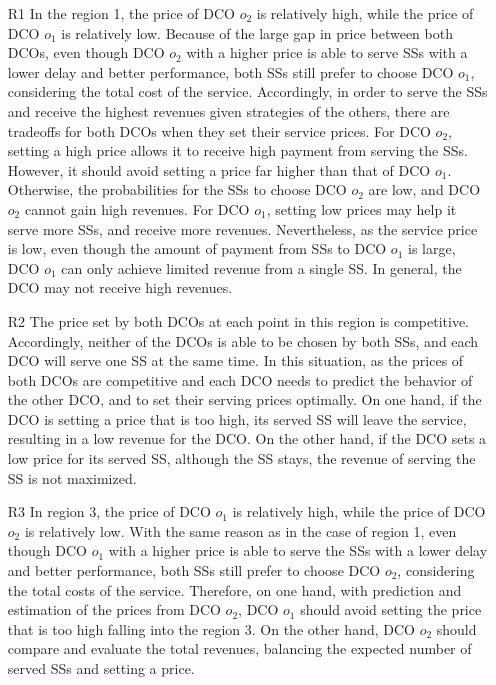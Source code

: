 \documentclass[twocolumn,10pt]{IEEEtran}
\begin{document}
\begin{enumerate}
  \item [R1] In the region 1, the price of DCO $o_2$ is relatively high, while the price of DCO $o_1$ is relatively low. Because of the large gap in price between both DCOs, even though DCO $o_2$ with a higher price is able to serve SSs with a lower delay and better performance, both SSs still prefer to choose DCO $o_1$, considering the total cost of the service. Accordingly, in order to serve the SSs and receive the highest revenues given strategies of the others, there are tradeoffs for both DCOs when they set their service prices. For DCO $o_2$, setting a high price allows it to receive high payment from serving the SSs. However, it should avoid setting a price far higher than that of DCO $o_1$. Otherwise, the probabilities for the SSs to choose DCO $o_2$ are low, and DCO $o_2$ cannot gain high revenues. For DCO $o_1$, setting low prices may help it serve more SSs, and receive more revenues. Nevertheless, as the service price is low, even though the amount of payment from SSs to DCO $o_1$ is large, DCO $o_1$ can only achieve limited revenue from a single SS. In general, the DCO may not receive high revenues.



  \item [R2] The price set by both DCOs at each point in this region is competitive. Accordingly, neither of the DCOs is able to be chosen by both SSs, and each DCO will serve one SS at the same time. In this situation, as the prices of both DCOs are competitive and each DCO needs to predict the behavior of the other DCO, and to set their serving prices optimally. On one hand, if the DCO is setting a price that is too high, its served SS will leave the service, resulting in a low revenue for the DCO. On the other hand, if the DCO sets a low price for its served SS, although the SS stays, the revenue of serving the SS is not maximized.

\item [R3] In region 3, the price of DCO $o_1$ is relatively high, while the price of DCO $o_2$ is relatively low. With the same reason as in the case of region 1, even though DCO $o_1$ with a higher price is able to serve the SSs with a lower delay and better performance, both SSs still prefer to choose DCO $o_2$, considering the total costs of the service. Therefore, on one hand, with prediction and estimation of the prices from DCO $o_2$, DCO $o_1$ should avoid setting the price that is too high falling into the region 3. On the other hand, DCO $o_2$ should compare and evaluate the total revenues, balancing the expected number of served SSs and setting a price.

\end{enumerate}
\end{document}
